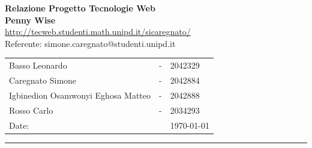 \begin{titlepage}
\noindent{}
\vspace{15pt}
\textcolor{UM_Brown}{
\begin{flushleft}
    \textbf{\huge{Relazione Progetto Tecnologie Web}}\\
    \vspace{15pt}
    \huge \textbf{Penny Wise} \\
    \vspace{15pt}
    \large \url{http://tecweb.studenti.math.unipd.it/sicaregnato/} \\
    \large Referente: simone.caregnato@studenti.unipd.it
\end{flushleft}
}
\vspace{135pt}
\textcolor{UM_Brown}{
\begin{flushright}
\begin{tabular}{lcl}
    Basso Leonardo & - & 2042329 \\
    Caregnato Simone & - & 2042884 \\
    Igbinedion Osamwonyi Eghosa Matteo & - & 2042888 \\
    Rosso Carlo & - & 2034293 \\
    Date: &  & \today
\end{tabular}
\end{flushright}
\hrule
}
\end{titlepage}
